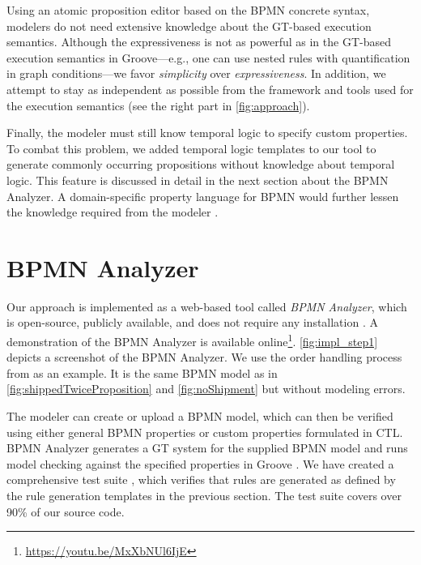 \documentclass{lmcs} %
\begin{document}
Using an atomic proposition editor based on the BPMN concrete syntax, modelers do not need extensive knowledge about the GT-based execution semantics. 
Although the expressiveness is not as powerful as in the GT-based execution semantics in Groove---e.g., one can use nested rules with quantification in graph conditions---we favor \textit{simplicity} over \textit{expressiveness}.
In addition, we attempt to stay as independent as possible from the framework and tools used for the execution semantics (see the right part in \autoref{fig:approach}).

Finally, the modeler must still know temporal logic to specify custom properties.
To combat this problem, we added temporal logic templates to our tool to generate commonly occurring propositions without knowledge about temporal logic.
This feature is discussed in detail in the next section about the BPMN Analyzer.
A domain-specific property language for BPMN would further lessen the knowledge required from the modeler \cite{meyersProMoBoxFrameworkGenerating2014}.

\section{BPMN Analyzer} \label{sec:impl}

Our approach is implemented as a web-based tool called \textit{BPMN Analyzer}, which is open-source, publicly available, and does not require any installation \cite{timkrauterLMCS2024Artifacts2023, krauterFormalizationAnalysisBPMN2023}.
A demonstration of the BPMN Analyzer is available online\footnote{\url{https://youtu.be/MxXbNUl6IjE}}.
\autoref{fig:impl_step1} depicts a screenshot of the BPMN Analyzer.
We use the order handling process from \cite{ruckerPracticalProcessAutomation2021} as an example.
It is the same BPMN model as in \autoref{fig:shippedTwiceProposition} and \autoref{fig:noShipment} but without modeling errors.

The modeler can create or upload a BPMN model, which can then be verified using either general BPMN properties or custom properties formulated in CTL.
BPMN Analyzer generates a GT system for the supplied BPMN model and runs model checking against the specified properties in Groove \cite{kastenbergModelCheckingDynamic2006, rensinkExplicitStateModel2008}. 
We have created a comprehensive test suite \cite{timkrauterLMCS2024Artifacts2023}, which verifies that rules are generated as defined by the rule generation templates in the previous section.
The test suite covers over 90\% of our source code.
\end{document}
